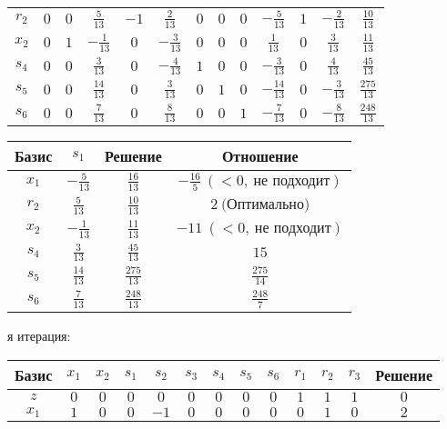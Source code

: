 \documentclass{article}%
\begin{document}
\begin{flushleft}
\begin{tabular}{|c|ccccccccccc|c|}
$r_{2}$&$0$&$0$&$\frac{5}{13}$&$-1$&$\frac{2}{13}$&$0$&$0$&$0$&$-\frac{5}{13}$&$1$&$-\frac{2}{13}$&$\frac{10}{13}$\\%
$x_{2}$&$0$&$1$&$-\frac{1}{13}$&$0$&$-\frac{3}{13}$&$0$&$0$&$0$&$\frac{1}{13}$&$0$&$\frac{3}{13}$&$\frac{11}{13}$\\%
$s_{4}$&$0$&$0$&$\frac{3}{13}$&$0$&$-\frac{4}{13}$&$1$&$0$&$0$&$-\frac{3}{13}$&$0$&$\frac{4}{13}$&$\frac{45}{13}$\\%
$s_{5}$&$0$&$0$&$\frac{14}{13}$&$0$&$\frac{3}{13}$&$0$&$1$&$0$&$-\frac{14}{13}$&$0$&$-\frac{3}{13}$&$\frac{275}{13}$\\%
$s_{6}$&$0$&$0$&$\frac{7}{13}$&$0$&$\frac{8}{13}$&$0$&$0$&$1$&$-\frac{7}{13}$&$0$&$-\frac{8}{13}$&$\frac{248}{13}$\\%
\hline%
\end{tabular}%
\newline%
\newline%
\newline%
\begin{tabular}{|cccc|}%
\hline%
Базис&$s_{1}$&Решение&Отношение\\%
\hline%
$x_{1}$&$-\frac{5}{13}$&$\frac{16}{13}$&$-\frac{16}{5}\: (< 0, \: \text{не подходит})$\\%
$r_{2}$&$\frac{5}{13}$&$\frac{10}{13}$&$2\: \text{(Оптимально)}$\\%
$x_{2}$&$-\frac{1}{13}$&$\frac{11}{13}$&$-11\: (< 0, \: \text{не подходит})$\\%
$s_{4}$&$\frac{3}{13}$&$\frac{45}{13}$&$15$\\%
$s_{5}$&$\frac{14}{13}$&$\frac{275}{13}$&$\frac{275}{14}$\\%
$s_{6}$&$\frac{7}{13}$&$\frac{248}{13}$&$\frac{248}{7}$\\%
\hline%
\end{tabular}%
\newline%
\newline%
я итерация: %
\newline%
\newline%
\renewcommand{\arraystretch}{1.3}%
\begin{tabular}{|c|ccccccccccc|c|}%
\hline%
Базис&$x_{1}$&$x_{2}$&$s_{1}$&$s_{2}$&$s_{3}$&$s_{4}$&$s_{5}$&$s_{6}$&$r_{1}$&$r_{2}$&$r_{3}$&Решение\\%
\hline%
$z$&$0$&$0$&$0$&$0$&$0$&$0$&$0$&$0$&$1$&$1$&$1$&$0$\\%
\hline%
$x_{1}$&$1$&$0$&$0$&$-1$&$0$&$0$&$0$&$0$&$0$&$1$&$0$&$2$\\%

\end{tabular}
\end{flushleft}
\end{document}
